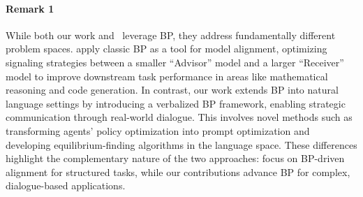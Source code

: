 \paragraph{Remark 1}  

While both our work and~\citet{bai2024efficient} leverage BP, they address fundamentally different problem spaces. 
\citet{bai2024efficient} apply classic BP as a tool for model alignment, optimizing signaling strategies between a smaller ``Advisor'' model and a larger ``Receiver'' model to improve downstream task performance in areas like mathematical reasoning and code generation. 
In contrast, our work extends BP into natural language settings by introducing a verbalized BP framework, enabling strategic communication through real-world dialogue. 
This involves novel methods such as transforming agents' policy optimization into prompt optimization and developing equilibrium-finding algorithms in the language space. 
These differences highlight the complementary nature of the two approaches: \citet{bai2024efficient} focus on BP-driven alignment for structured tasks, while our contributions advance BP for complex, dialogue-based applications.
